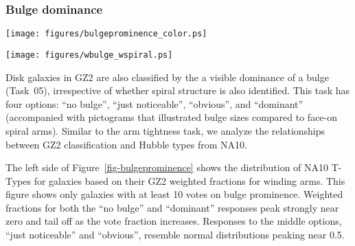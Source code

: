 \documentclass[useAMS,usenatbib]{mn2e}
\begin{document}

\subsubsection{Bulge dominance}

\begin{figure*}
\texttt{[image: figures/bulgeprominence\_color.ps]}
\caption{T-Type classifications compared to the GZ2 vote fractions for bulge prominence (Task 05). Left side is NA10 T-Types; right side is EFIGI T-Types. Data are for the 7,120 (NA10) and 2,321 (EFIGI) galaxies, respectively, with at least 10 GZ2 votes for Task 05. The number of galaxies per bin is indicated along the top of each panel. 
\label{fig-bulgeprominence}}
\end{figure*}

\begin{figure*}
\texttt{[image: figures/wbulge\_wspiral.ps]}
\caption{Weighted bulge classifications vs. weighted spiral classifications from GZ2. Galaxies are color-coded by their morphologies in EFIGI ({\it top}) and NA10 ({\it bottom}). Data are for galaxies with at least 10 classifications for both Task 05 (bulge dominance) and Task 10 (spiral structure) in GZ2. 
\label{fig-bulgespiral}}
\end{figure*}

Disk galaxies in GZ2 are also classified by the a visible dominance of a bulge (Task~05), irrespective of whether spiral structure is also identified. This task has four options: ``no bulge'', ``just noticeable'', ``obvious'', and ``dominant'' (accompanied with pictograms that illustrated bulge sizes compared to face-on spiral arms). Similar to the arm tightness task, we analyze the relationships between GZ2 classification and Hubble types from NA10. 

The left side of Figure~\ref{fig-bulgeprominence} shows the distribution of NA10 T-Types for galaxies based on their GZ2 weighted fractions for winding arms. This figure shows only galaxies with at least 10 votes on bulge prominence. Weighted fractions for both the ``no bulge'' and ``dominant'' responses peak strongly near zero and tail off as the vote fraction increases. Responses to the middle options, ``just noticeable'' and ``obvious'', resemble normal distributions peaking near 0.5. 
\end{document}
